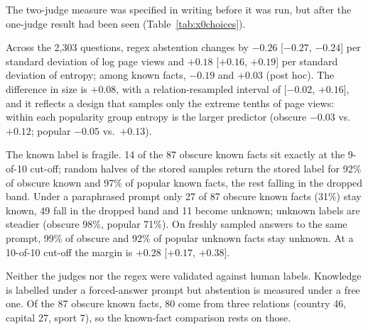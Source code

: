 The two-judge measure was specified in writing before it was run, but after the one-judge result had been seen (Table~\ref{tab:x0choices}).

Across the 2,303 questions, regex abstention changes by $-0.26$ [$-0.27$, $-0.24$] per standard deviation of log page views and $+0.18$ [$+0.16$, $+0.19$] per standard deviation of entropy; among known facts, $-0.19$ and $+0.03$ (post hoc). The difference in size is $+0.08$, with a relation-resampled interval of [$-0.02$, $+0.16$], and it reflects a design that samples only the extreme tenths of page views: within each popularity group entropy is the larger predictor (obscure $-0.03$ vs.\ $+0.12$; popular $-0.05$ vs.\ $+0.13$).


The known label is fragile. 14 of the 87 obscure known facts sit exactly at the 9-of-10 cut-off; random halves of the stored samples return the stored label for 92\% of obscure known and 97\% of popular known facts, the rest falling in the dropped band. Under a paraphrased prompt only 27 of 87 obscure known facts (31\%) stay known, 49 fall in the dropped band and 11 become unknown; unknown labels are steadier (obscure 98\%, popular 71\%). On freshly sampled answers to the same prompt, 99\% of obscure and 92\% of popular unknown facts stay unknown. At a 10-of-10 cut-off the margin is $+0.28$ [$+0.17$, $+0.38$].

Neither the judges nor the regex were validated against human labels. Knowledge is labelled under a forced-answer prompt but abstention is measured under a free one. Of the 87 obscure known facts, 80 come from three relations (country 46, capital 27, sport 7), so the known-fact comparison rests on those.

